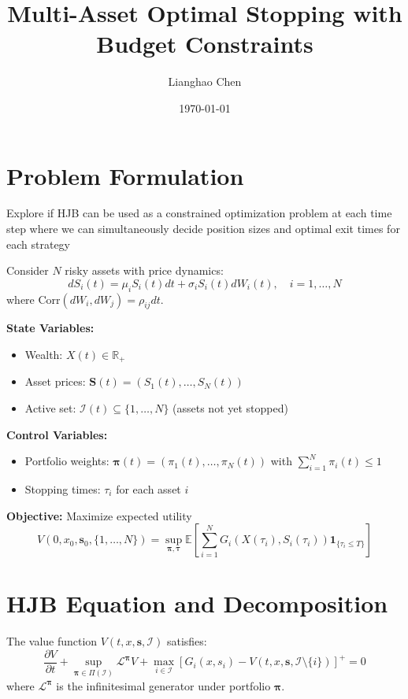 \documentclass[11pt]{article}
\title{Multi-Asset Optimal Stopping with Budget Constraints}
\author{Lianghao Chen}
\date{\today}
\begin{document}
\maketitle
\vspace{-1cm}

\section{Problem Formulation}

Explore if HJB can be used as a constrained optimization problem at each
time step where we can simultaneously decide position sizes and optimal exit times for
each strategy

Consider $N$ risky assets with price dynamics:
\begin{equation}
dS_i(t) = \mu_i S_i(t) dt + \sigma_i S_i(t) dW_i(t), \quad i = 1, \ldots, N
\end{equation}
where $\text{Corr}(dW_i, dW_j) = \rho_{ij}dt$.

\textbf{State Variables:}
\begin{itemize}
\item Wealth: $X(t) \in \mathbb{R}_+$
\item Asset prices: $\mathbf{S}(t) = (S_1(t), \ldots, S_N(t))$
\item Active set: $\mathcal{I}(t) \subseteq \{1, \ldots, N\}$ (assets not yet stopped)
\end{itemize}

\textbf{Control Variables:}
\begin{itemize}
\item Portfolio weights: $\boldsymbol{\pi}(t) = (\pi_1(t), \ldots, \pi_N(t))$ with $\sum_{i=1}^N \pi_i(t) \leq 1$
\item Stopping times: $\tau_i$ for each asset $i$
\end{itemize}

\textbf{Objective:} Maximize expected utility
\begin{equation}
V(0, x_0, \mathbf{s}_0, \{1,\ldots,N\}) = \sup_{\boldsymbol{\pi}, \boldsymbol{\tau}} \mathbb{E}\left[\sum_{i=1}^N G_i(X(\tau_i), S_i(\tau_i)) \mathbf{1}_{\{\tau_i \leq T\}}\right]
\end{equation}

\section{HJB Equation and Decomposition}

The value function $V(t, x, \mathbf{s}, \mathcal{I})$ satisfies:
\begin{equation}
\frac{\partial V}{\partial t} + \sup_{\boldsymbol{\pi} \in \Pi(\mathcal{I})} \mathcal{L}^{\boldsymbol{\pi}} V + \max_{i \in \mathcal{I}} \left[G_i(x, s_i) - V(t, x, \mathbf{s}, \mathcal{I} \setminus \{i\})\right]^+ = 0
\end{equation}
where $\mathcal{L}^{\boldsymbol{\pi}}$ is the infinitesimal generator under portfolio $\boldsymbol{\pi}$.
\end{document}
